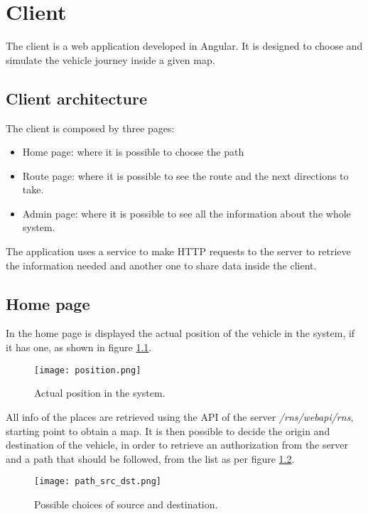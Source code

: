 \chapter{Client}\label{Chap:Client}
The client is a web application developed in Angular. It is designed to choose and simulate the vehicle journey inside a given map.

\section{Client architecture}
The client is composed by three pages:
\begin{itemize}
	\item Home page: where it is possible to choose the path
	\item Route page: where it is possible to see the route and the next directions to take.
	\item Admin page: where it is possible to see  all the information about the whole system.
\end{itemize}
The application uses a service to make HTTP requests to the server to retrieve the information needed and another one to share data inside the client.
\newpage

\section{Home page}

In the home page is displayed the actual position of the vehicle in the system, if it has one, as shown in figure \ref{Fig:Position}.

\begin{figure}[!htb]
	\centering
	\texttt{[image: position.png]}
	\caption{Actual position in the system.}\label{Fig:Position}
\end{figure}

All info of the places are retrieved using the API of the server \textit{/rns/webapi/rns}, starting point to obtain a map. It is then possible to decide the origin and destination of the vehicle, in order to retrieve an authorization from the server and a path that should be followed, from the list as per figure \ref{Fig:src_dst}.

\begin{figure}[!htb]
	\centering
	\texttt{[image: path\_src\_dst.png]}
	\caption{Possible choices of source and destination.}\label{Fig:src_dst}
\end{figure}

